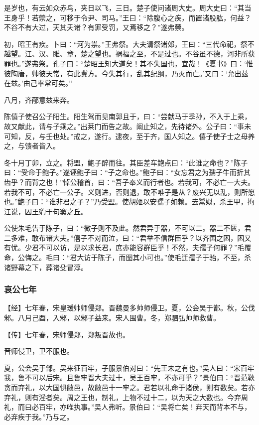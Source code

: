 \documentclass[]{article}
\begin{document}
是岁也，有云如众赤鸟，夹日以飞，三日。楚子使问诸周大史。周大史曰：``其当王身乎！若禜之，可移于令尹、司马。''王曰：``除腹心之疾，而置诸股肱，何益？不谷不有大过，天其夭诸？有罪受罚，又焉移之？''遂弗禜。

初，昭王有疾。卜曰：``河为祟。''王弗祭。大夫请祭诸郊，王曰：``三代命祀，祭不越望。江、汉、雎、章，楚之望也。祸福之至，不是过也。不谷虽不德，河非所获罪也。''遂弗祭。孔子曰：``楚昭王知大道矣！其不失国也，宜哉！《夏书》曰：`惟彼陶唐，帅彼天常，有此冀方。今失其行，乱其纪纲，乃灭而亡。'又曰：`允出兹在兹。'由己率常可矣。''

八月，齐邴意兹来奔。

陈僖子使召公子阳生。阳生驾而见南郭且于，曰：``尝献马于季孙，不入于上乘，故又献此，请与子乘之。''出莱门而告之故。阚止知之，先待诸外。公子曰：``事未可知，反，与壬也处。''戒之，遂行。逮夜，至于齐，国人知之。僖子使子士之母养之，与馈者皆入。

冬十月丁卯，立之。将盟，鲍子醉而往。其臣差车鲍点曰：``此谁之命也？''陈子曰：``受命于鲍子。''遂诬鲍子曰：``子之命也。''鲍子曰：``女忘君之为孺子牛而折其齿乎？而背之也！''悼公稽首，曰：``吾子奉义而行者也。若我可，不必亡一大夫。若我不可，不必亡一公子。义则进，否则退，敢不唯子是从？废兴无以乱，则所愿也。''鲍子曰：``谁非君之子？''乃受盟。使胡姬以安孺子如赖。去鬻姒，杀王甲，拘江说，囚王豹于句窦之丘。

公使朱毛告于陈子，曰：``微子则不及此。然君异于器，不可以二。器二不匮，君二多难，敢布诸大夫。''僖子不对而泣，曰：``君举不信群臣乎？以齐国之困，困又有忧。少君不可以访，是以求长君，庶亦能容群臣乎！不然，夫孺子何罪？''毛覆命，公悔之。毛曰：``君大访于陈子，而图其小可也。''使毛迁孺子于骀，不至，杀诸野幕之下，葬诸殳冒淳。

\hypertarget{header-n3109}{%
\subsubsection{哀公七年}\label{header-n3109}}

【经】七年春，宋皇瑗帅师侵郑。晋魏曼多帅师侵卫。夏，公会吴于鄫。秋，公伐邾。八月己酉，入邾，以邾子益来。宋人围曹。冬，郑驷弘帅师救曹。

【传】七年春，宋师侵郑，郑叛晋故也。

晋师侵卫，卫不服也。

夏，公会吴于鄫。吴来征百牢，子服景伯对曰：``先王未之有也。''吴人曰：``宋百牢我，鲁不可以后宋。且鲁牢晋大夫过十，吴王百牢，不亦可乎？''景伯曰：``晋范鞅贪而弃礼，以大国惧敝邑，故敝邑十一牢之。君若以礼命于诸侯，则有数矣。若亦弃礼，则有淫者矣。周之王也，制礼，上物不过十二，以为天之大数也。今弃周礼，而曰必百牢，亦唯执事。''吴人弗听。景伯曰：``吴将亡矣！弃天而背本不与，必弃疾于我。''乃与之。
\end{document}
